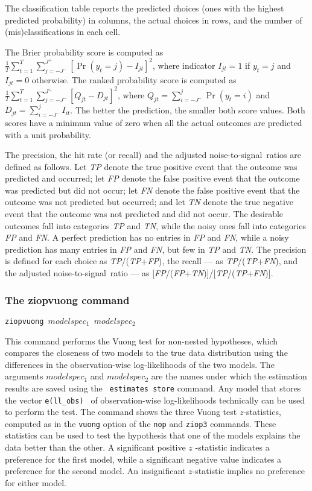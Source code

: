 \documentclass[letterpaper,fleqn,12pt]{article}
\begin{document}
The classification table reports the predicted choices (ones with the
highest predicted probability) in columns, the actual choices in rows, and
the number of (mis)classifications in each cell.

The Brier probability score is computed as $\frac{1}{T}\sum_{t=1}^{T}%
\sum_{j=-J^{-}}^{J^{+}}[\Pr (y_{t}=j)-I_{jt}]^{2}$, where indicator $%
I_{jt}=1 $ if $y_{t}=j$ and $I_{jt}=0$ otherwise. The ranked probability
score is computed as $\frac{1}{T}\sum_{t=1}^{T}%
\sum_{j=-J^{-}}^{J^{+}}[Q_{jt}-D_{jt}]^{2}$, where $Q_{jt}=%
\sum_{i=-J^{-}}^{j}\Pr (y_{t}=i)$ and $D_{jt}=\sum_{i=-J^{-}}^{j}I_{it}$.
The better the prediction, the smaller both score values. Both scores have a
minimum value of zero when all the actual outcomes are predicted with a unit
probability.

The precision, the hit rate (or recall) and the adjusted noise-to-signal\
ratios are defined as follows. Let \emph{TP} denote the true positive event
that the outcome was predicted and occurred; let \emph{FP} denote the false
positive event that the outcome was predicted but did not occur; let \emph{FN%
} denote the false positive event that the outcome was not predicted but
occurred; and let \emph{TN} denote the true negative event that the outcome
was not predicted and did not occur. The desirable outcomes fall into
categories \emph{TP} and \emph{TN}, while the noisy ones fall into
categories \emph{FP} and \emph{FN}. A perfect prediction has no entries in 
\emph{FP} and \emph{FN}, while a noisy prediction has many entries in \emph{%
FP }and \emph{FN}, but few in \emph{TP} and \emph{TN}. The precision is
defined for each choice as \emph{TP}/(\emph{TP}+\emph{FP}), the recall ---
as \emph{TP}/(\emph{TP}+\emph{FN}), and the adjusted noise-to-signal\ ratio
--- as [\emph{FP}/(\emph{FP}+\emph{TN})]/[\emph{TP}/(\emph{TP}+\emph{FN})].

\subsubsection*{The ziopvuong command}

\texttt{ziopvuong $modelspec_{1}$ $modelspec_{2}$}

\smallskip

This command performs the Vuong test for non-nested hypotheses, which
compares the closeness of two models to the true data distribution using the
differences in the observation-wise log-likelihoods of the two models. The
arguments \texttt{$modelspec_{1}$} and \texttt{$modelspec_{2}$} are the
names under which the estimation results are saved using the \texttt{%
estimates store} command. Any model that stores the vector \texttt{e(ll\_obs)%
} of observation-wise log-likelihoods technically can be used to perform the
test. The command shows the three Vuong test $z$-statistics, computed as in
the \texttt{vuong} option of the \texttt{nop} and \texttt{ziop3} commands.
These statistics can be used to test the hypothesis that one of the models
explains the data better than the other. A significant positive $z$%
-statistic indicates a preference for the first model, while a significant
negative value indicates a preference for the second model. An insignificant 
$z$-statistic implies no preference for either model.
\end{document}
